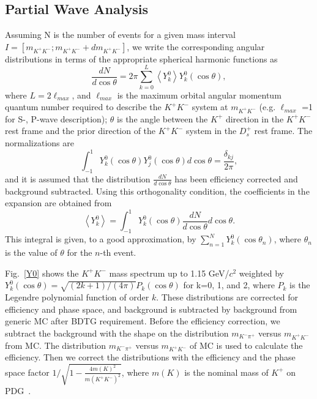 \subsection{Partial Wave Analysis}
\par{Assuming N is the number of events for a given mass interval $I=[m_{K^{+}K^{-}}; m_{K^{+}K^{-}} + dm_{K^{+}K^{-}}]$, we write the corresponding angular distributions in terms of the appropriate spherical harmonic functions as 
    \begin{equation}
        \frac{dN}{d\cos\theta} = 2\pi\sum_{k=0}^L\left\langle Y_{k}^{0}\right\rangle Y_{k}^{0}(\cos\theta),\label{expansion}
    \end{equation}
    where $L = 2 \ell_{max}$, and $\ell_{max}$ is the maximum orbital angular momentum quantum number required to describe the $K^{+}K^{-}$ system at $m_{K^{+}K^{-}}$ (e.g. $\ell_{max}$ =1 for S-, P-wave description); $\theta$ is the angle between the $K^{+}$ direction in the $K^{+}K^{-}$ rest frame and the prior direction of the $K^{+}K^{-}$ system in the $D_{s}^{+}$ rest frame. 
    The normalizations are 
    \begin{equation}
        \int_{-1}^{1}Y_{k}^{0}(\cos\theta)Y_{j}^{0}(\cos\theta) d\cos\theta  = \frac{\delta_{kj}}{2\pi},\label{sh-normalizations}
    \end{equation}
    and it is  assumed that the distribution $\frac{dN}{d\cos\theta}$ has been efficiency corrected and background subtracted.
    Using this orthogonality condition, the coefficients in the expansion are obtained from 
    \begin{equation}
        \left\langle Y_{k}^{0} \right\rangle = \int_{-1}^{1}Y_{k}^{0}(\cos\theta) \frac{dN}{d\cos\theta} d\cos\theta. \label{expansion-coefficiencies}
    \end{equation}
    This integral is given, to a good approximation, by $\sum_{n=1}^{N}Y_{k}^{0}(\cos\theta_{n})$, where $\theta_{n}$ is the value of $\theta$ for the $n$-th event.
    
    Fig.~\ref{Y0} shows the $K^{+}K^{-}$ mass spectrum up to 1.15 GeV/$c^{2}$ weighted by $Y_{k}^{0}(\cos\theta) = \sqrt{(2k+1)/(4\pi)}P_{k}(\cos\theta)$ for k=0, 1, and 2, where $P_{k}$ is the Legendre polynomial function of order $k$. 
    These distributions are corrected for efficiency and phase space, and background is subtracted by background from generic MC after BDTG requirement.
    Before the efficiency correction, we subtract the background with the shape on the distribution $m_{K^{-}\pi^{+}}$ versus $m_{K^{+}K^{-}}$ from MC. 
    The distribution $m_{K^{-}\pi^{+}}$ versus $m_{K^{+}K^{-}}$ of MC is used to calculate the efficiency.
    Then we correct the distributions with the efficiency and the phase space factor $1/\sqrt{ 1 - \frac{4m(K)^{2}}{m(K^{+}K^{-})^{2}}}$, where $m(K)$ is the nominal mass of $K^{+}$ on PDG~\cite{PDG2018}.
    
}
